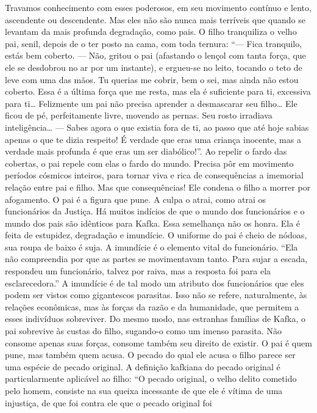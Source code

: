 Travamos conhecimento com esses poderosos, em seu movimento contínuo e
lento, ascendente ou descendente. Mas eles não são nunca mais terríveis
que quando se levantam da mais profunda degradação, como pais. O filho
tranquiliza o velho pai, senil, depois de o ter posto na cama, com toda
ternura: ``--- Fica tranquilo, estás bem coberto. --- Não, gritou o pai
(afastando o lençol com tanta força, que ele se desdobrou no ar por um
instante), e ergueu-se no leito, tocando o teto de leve com uma das
mãos. Tu querias me cobrir, bem o sei, mas ainda não estou coberto. Essa
é a última força que me resta, mas ela é suficiente para ti, excessiva
para ti\ldots{} Felizmente um pai não precisa aprender a desmascarar seu
filho\ldots{} Ele ficou de pé, perfeitamente livre, movendo as pernas. Seu
rosto irradiava inteligência\ldots{} --- Sabes agora o que existia fora de
ti, ao passo que até hoje sabias apenas o que te dizia respeito! É
verdade que eras uma criança inocente, mas a verdade mais profunda é que
eras um ser diabólico!''. Ao repelir o fardo das cobertas, o pai repele
com elas o fardo do mundo. Precisa pôr em movimento períodos cósmicos
inteiros, para tornar viva e rica de consequências a imemorial relação
entre pai e filho. Mas que consequências! Ele condena o filho a morrer
por afogamento. O pai é a figura que pune. A culpa o atrai, como atrai
os funcionários da Justiça. Há muitos indícios de que o mundo dos
funcionários e o mundo dos pais são idênticos para Kafka. Essa
semelhança não os honra. Ela é feita de estupidez, degradação e
imundície. O uniforme do pai é cheio de nódoas, sua roupa de baixo é
suja. A imundície é o elemento vital do funcionário. ``Ela não
compreendia por que as partes se movimentavam tanto. Para sujar a
escada, respondeu um funcionário, talvez por raiva, mas a resposta foi
para ela esclarecedora.'' A imundície é de tal modo um atributo dos
funcionários que eles podem ser vistos como gigantescos parasitas. Isso
não se refere, naturalmente, às relações econômicas, mas às forças da
razão e da humanidade, que permitem a esses indivíduos sobreviver. Do
mesmo modo, nas estranhas famílias de Kafka, o pai sobrevive às custas
do filho, sugando-o como um imenso parasita. Não consome apenas suas
forças, consome também seu direito de existir. O pai é quem pune, mas
também quem acusa. O pecado do qual ele acusa o filho parece ser uma
espécie de pecado original. A definição kafkiana do pecado original é
particularmente aplicável ao filho: ``O pecado original, o velho delito
cometido pelo homem, consiste na sua queixa incessante de que ele é
vítima de uma injustiça, de que foi contra ele que o pecado original foi
